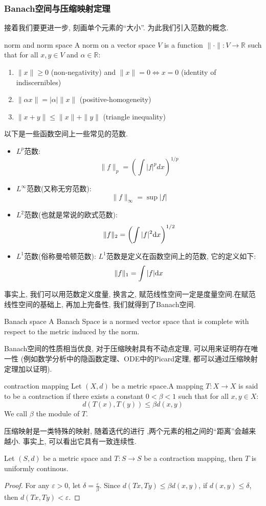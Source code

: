 \subsubsection{Banach空间与压缩映射定理}
接着我们要更进一步, 刻画单个元素的“大小”. 为此我们引入范数的概念.
\begin{definition}{norm and norm space}
    A norm on a vector space $V$ is a function $\|\cdot\|: V \to \mathbb{R}$ such that for all $x, y \in V$ and $\alpha \in \mathbb{R}$:
    \begin{enumerate}
        \item $\|x\| \geq 0$ (non-negativity) and $\|x\| = 0 \iff x = 0$ (identity of indiscernibles)
        \item $\|\alpha x\| = |\alpha| \|x\|$ (positive-homogeneity)
        \item $\|x + y\| \leq \|x\| + \|y\|$ (triangle inequality)
    \end{enumerate}
\end{definition}
以下是一些函数空间上一些常见的范数.
\begin{itemize}
    \item $L^p$范数:
        $$\|f\|_p = \left(\int |f|^p dx\right)^{1/p}$$
    \item $L^\infty$范数(又称无穷范数): 
        $$\|f\|_\infty = \sup |f|$$
    \item $L^2$范数(也就是常说的欧式范数): 
        $$\|f\|_2 = \left(\int |f|^2 {\rm d}x\right)^{1/2}$$
    \item $L^1$范数(俗称曼哈顿范数): $L^1$范数是定义在函数空间上的范数, 它的定义如下:
        $$\|f\|_1 = \int |f| {\rm d}x$$
\end{itemize}
事实上, 我们可以用范数定义度量, 换言之, 赋范线性空间一定是度量空间.在赋范线性空间的基础上, 再加上完备性, 我们就得到了Banach空间.
\begin{definition}{Banach space}
    A Banach Space is a normed vector space that is complete with respect to the metric induced by the norm.
\end{definition}
Banach空间的性质相当优良, 对于压缩映射具有不动点定理, 可以用来证明存在唯一性
(例如数学分析中的隐函数定理、ODE中的Picard定理, 都可以通过压缩映射定理加以证明).
\begin{definition}{contraction mapping}
    Let $(X,d)$ be a metric space.A mapping $T: X \to X$ is said to be a contraction if there exists a constant $0 < \beta < 1$ such that for all $x, y \in X$:
    $$d(T(x),T(y)) \leq \beta d(x,y)$$
    We call $\beta$ the module of $T$.
\end{definition}
压缩映射是一类特殊的映射, 随着迭代的进行 ,两个元素的相之间的“距离”会越来越小. 事实上, 可以看出它具有一致连续性.
\begin{lemma}
    Let $(S,d)$ be a metric space and $T:S\to S$ be a contraction mapping, then $T$ is uniformly continous. 
\end{lemma}
\begin{proof}
    For any $\varepsilon>0$, let $\delta = \frac{\varepsilon}{\beta}$. 
    Since $d(Tx,Ty)\leq \beta d(x,y)$, if $d(x,y)\leq \delta$, then $d(Tx,Ty)<\varepsilon$. 
\end{proof}
\newpage

